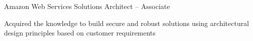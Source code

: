 

\begin{cventries}

  \cventry
  {Amazon Web Services} %
  {Solutions Architect – Associate} %
  {} %
  {} %
  {
    \begin{cvitems} %
      \item {Acquired the knowledge to build secure and robust solutions using architectural design principles based on customer requirements}
    \end{cvitems}
  }


\end{cventries}